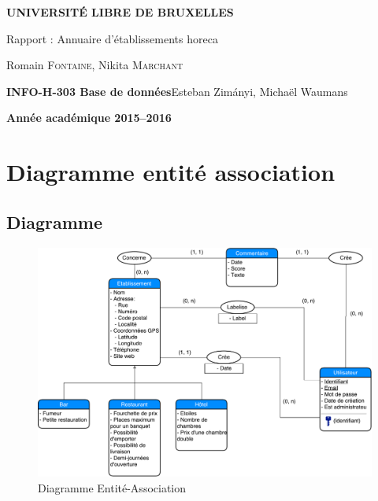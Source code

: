\documentclass[10pt,a4paper]{article}
\begin{document}
\begin{titlepage}
    \begin{center}
        \textbf{\textsc{UNIVERSIT\'E LIBRE DE BRUXELLES}}\\
        \vfill{}\vfill{}
        \begin{center}{\Huge Rapport : Annuaire d’établissements horeca}\end{center}{\Huge \par}
        \begin{center}{\large Romain \textsc{Fontaine}, Nikita \textsc{Marchant}}\end{center}{\Huge \par}
        \vfill{}\vfill{} \vfill{}
        \begin{flushleft}{\large \textbf{INFO-H-303 Base de données}}\hfill{Esteban Zimányi, Michaël Waumans}\end{flushleft}{\large\par}
        \vfill{}\vfill{}\enlargethispage{3cm}
        \textbf{Année académique 2015--2016}
    \end{center}
\end{titlepage}

\setlength{\parindent}{1.5em}
\setlength{\parskip}{1em}
\linespread{1.1}

\tableofcontents

\section{Diagramme entité association}
\subsection{Diagramme}
\begin{figure}[h]
    \includegraphics[scale=0.40]{EA.pdf}
    \caption{Diagramme Entité-Association}
    \label{diagram}
\end{figure}
\FloatBarrier
\end{document}
